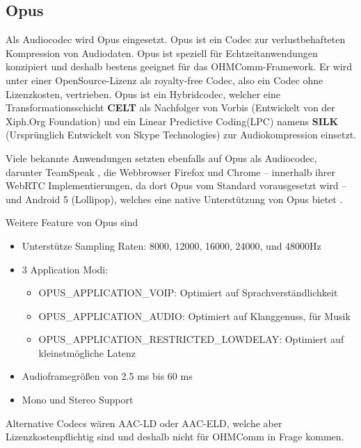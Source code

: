 \subsection{Opus}

Als Audiocodec wird Opus \cite{Opus} eingesetzt. Opus ist ein Codec zur verlustbehafteten Kompression von Audiodaten. Opus ist speziell für Echtzeitanwendungen konzipiert und deshalb bestens geeignet für das OHMComm-Framework. Er wird unter einer OpenSource-Lizenz \cite{Opus:License} als royalty-free Codec, also ein Codec ohne Lizenzkosten, vertrieben. Opus ist ein Hybridcodec, welcher eine Transformationsschicht \textbf{CELT} als Nachfolger von Vorbis (Entwickelt von der Xiph.Org Foundation) \cite{CELT} und ein Linear Predictive Coding(LPC) namens \textbf{SILK} (Ursprünglich Entwickelt von Skype Technologies) \cite{SILK} zur Audiokompression einsetzt.

Viele bekannte Anwendungen setzten ebenfalls auf Opus als Audiocodec, darunter TeamSpeak \cite{TeamSpeak:Opus}, die Webbrowser Firefox \cite{Firefox:Opus} und Chrome \cite{Chrome:Opus} -- innerhalb ihrer WebRTC Implementierungen, da dort Opus vom Standard vorausgesetzt wird \cite{WebRTC:Opus} -- und Android 5 (Lollipop), welches eine native Unterstützung von Opus bietet \cite{Android5:Opus}.

Weitere Feature von Opus sind \cite{Opus:API}

\begin{itemize}
\label{Opus Sample Rate}
\item Unterstütze Sampling Raten: 8000, 12000, 16000, 24000, und 48000Hz
\item 3 Application Modi:
\begin{itemize}
\label{Opus Application Modi}
\item OPUS\_APPLICATION\_VOIP: Optimiert auf Sprachverständlichkeit
\item OPUS\_APPLICATION\_AUDIO: Optimiert auf Klanggenuss, für Musik
\item OPUS\_APPLICATION\_RESTRICTED\_LOWDELAY: Optimiert auf kleinstmögliche Latenz
\end{itemize}
\label{Opus Audioframe}
\item Audioframegrößen von 2.5 ms bis 60 ms
\item Mono und Stereo Support
\end{itemize}

Alternative Codecs wären AAC-LD oder AAC-ELD, welche aber Lizenzkostenpflichtig \cite{AAC:LD-ELD} sind und deshalb nicht für OHMComm in Frage kommen.

